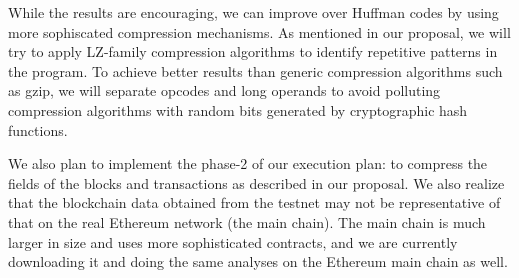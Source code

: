 \documentclass[12pt]{article}
\begin{document}
While the results are encouraging, we can improve over Huffman codes by using more sophiscated compression mechanisms. As mentioned
in our proposal, we will try to apply LZ-family compression algorithms to identify repetitive patterns in the program. To achieve
better results than generic compression algorithms such as gzip, we will separate opcodes and long operands to avoid polluting
compression algorithms with random bits generated by cryptographic hash functions.

We also plan to implement the phase-2 of our execution plan: to compress the fields of the blocks and transactions as described in our
proposal. We also realize that the blockchain data obtained from the testnet may not be representative of that on the real Ethereum network
(the main chain). The main chain is much larger in size and uses more sophisticated contracts, and we are currently downloading it and doing the same analyses on the
Ethereum main chain as well.
\end{document}
